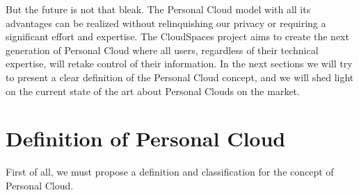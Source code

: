 But the future is not that bleak. The Personal Cloud model with all its advantages can be realized without relinquishing our privacy or requiring a significant effort and expertise.  The CloudSpaces project aims to create the next generation of Personal Cloud where all users, regardless of their technical expertise, will retake control of their information. In the next sections we will try to present a clear definition of the Personal Cloud concept, and we will shed light on the current state of the art about Personal Clouds on the market.



\section{Definition of Personal Cloud}

First of all, we must propose a definition and classification for the concept of Personal Cloud.




